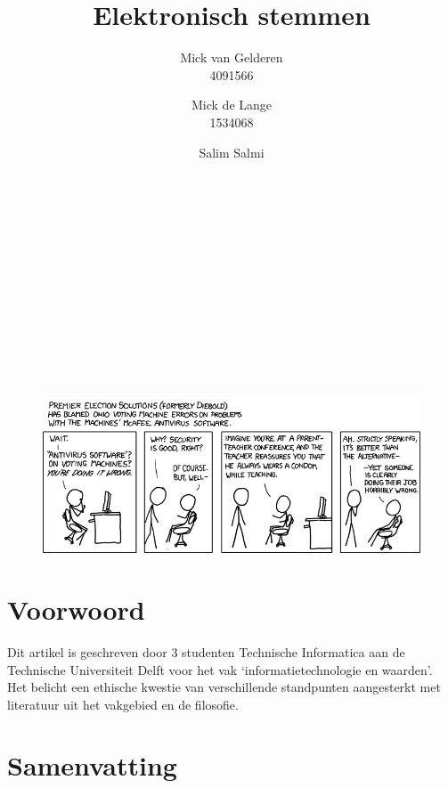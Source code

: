 \documentclass[a4paper]{article}
\title{Elektronisch stemmen}
\author{
Mick van Gelderen \\ 4091566 \and 
Mick de Lange \\ 1534068 \and
Salim Salmi \\ \TODO{stdnr}
}
\begin{document}
\thispagestyle{plain}
\maketitle

\hfill \\ \\ \\ \\ \\ \\ \\ \\ \\ \\
\begin{figure}[htp]
\centering
\includegraphics[width=\textwidth]{media/voting_machines.png}
\label{fig:voting-machines}

\end{figure}

\newpage

\thispagestyle{plain}

\section*{Voorwoord}
Dit artikel is geschreven door 3 studenten Technische Informatica aan de Technische Universiteit Delft voor het vak `informatietechnologie en waarden'.
Het belicht een ethische kwestie van verschillende standpunten aangesterkt met literatuur uit het vakgebied en de filosofie. 

\section*{Samenvatting}

\newpage
\end{document}
